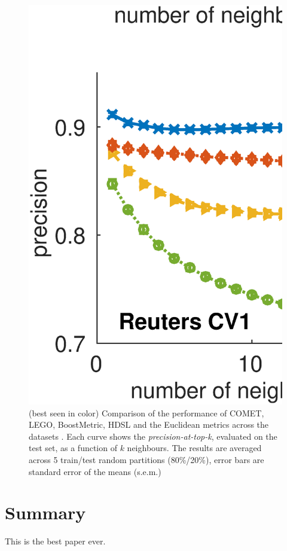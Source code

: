 \documentclass{article}
\begin{document}
\begin{figure}[ht]
\vskip 0.2in
\begin{center}
\centerline{\includegraphics[width=\columnwidth]{Precision_at_K_all_datasets}}
\caption{ (best seen in color) Comparison of the performance of COMET, LEGO, BoostMetric, HDSL and the Euclidean metrics across the datasets . Each curve shows the \textit{precision-at-top-k}, evaluated on the test set, as a function of $k$ neighbours. The results are averaged across 5 train/test random partitions (80\%/20\%), error bars are standard error of the means (s.e.m.) }
\label{precFig}
\end{center}
\vskip -0.2in
\end{figure} 

\section{Summary}
This is the best paper ever.






\end{document}

